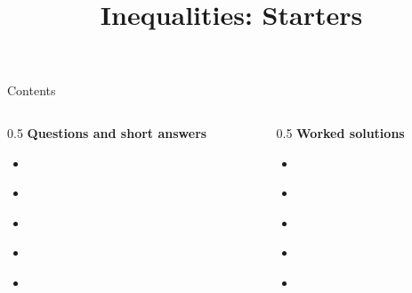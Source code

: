 \documentclass{beamer}
\title{Inequalities: Starters}
\author{}
\date{}
\begin{document}
\frame{\titlepage}

\begin{frame}{Contents}
\small
\begin{columns}[T]
\begin{column}{0.5\textwidth}
\textbf{Questions and short answers}
\begin{itemize}
\item \hyperlink{q-st1}{}
\item \hyperlink{q-st2}{}
\item \hyperlink{q-st3}{}
\item \hyperlink{q-st4}{}
\item \hyperlink{q-st5}{}
\end{itemize}
\end{column}
\begin{column}{0.5\textwidth}
\textbf{Worked solutions}
\begin{itemize}
\item \hyperlink{work-st1}{}
\item \hyperlink{work-st2}{}
\item \hyperlink{work-st3}{}
\item \hyperlink{work-st4}{}
\item \hyperlink{work-st5}{}
\end{itemize}
\end{column}
\end{columns}
\end{frame}
\end{document}
